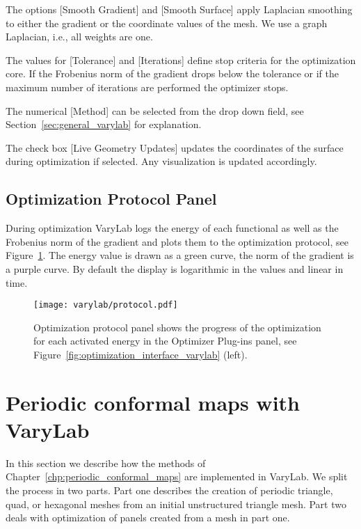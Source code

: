 \documentclass[Thesis.tex]{subfiles}
\begin{document}
The options [Smooth Gradient] and [Smooth Surface] apply Laplacian smoothing to either the gradient or the coordinate values of the mesh. We use a graph Laplacian, i.e., all weights are one.

The values for [Tolerance] and [Iterations] define stop criteria for the optimization core. If the Frobenius norm of the gradient drops below the tolerance or if the maximum number of iterations are performed the optimizer stops. 

The numerical [Method] can be selected from the drop down field, see Section~\ref{sec:general_varylab} for explanation.

The check box [Live Geometry Updates] updates the coordinates of the surface during optimization if selected. Any visualization is updated accordingly.

\subsection*{Optimization Protocol Panel}

During optimization {\sc VaryLab} logs the energy of each functional as well as the Frobenius norm of the gradient and plots them to the optimization protocol, see Figure~\ref{fig:protocol_interface_varylab}. The energy value is drawn as a green curve, the norm of the gradient is a purple curve. By default the display is logarithmic in the values and linear in time.

\begin{figure}
\begin{center}
\texttt{[image: varylab/protocol.pdf]}
\caption{Optimization protocol panel shows the progress of the optimization for each activated energy in the Optimizer Plug-ins panel, see Figure~\ref{fig:optimization_interface_varylab} (left).}
\label{fig:protocol_interface_varylab}
\end{center}
\end{figure}

\section{Periodic conformal maps with {\sc VaryLab}}
\label{sec:periodic_varylab}
In this section we describe how the methods of Chapter~\ref{chp:periodic_conformal_maps} are implemented in {\sc VaryLab}. We split the process in two parts. Part one describes the creation of periodic triangle, quad, or hexagonal meshes from an initial unstructured triangle mesh. Part two deals with optimization of panels created from a mesh in part one.
\end{document}
